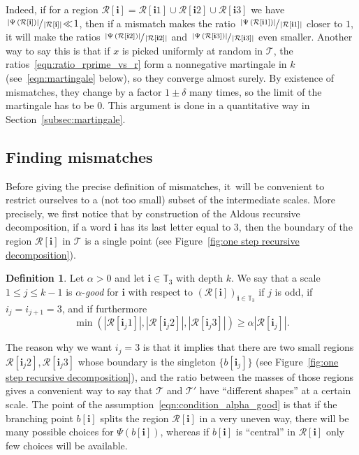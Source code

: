 \documentclass[11pt]{article}
\newcommand{\Tt}{\mathcal{T}}
\newcommand{\Rr}{\mathcal{R}}
\newcommand{\ii}{\mathbf{i}}
\theoremstyle{plain}
\theoremstyle{definition}
\newtheorem{definition}[theorem]{Definition}
\numberwithin{equation}{section}
\begin{document}
Indeed, if for a region $\Rr[\ii]=\Rr[\ii 1] \cup \Rr[\ii 2] \cup \Rr[\ii 3]$ we have \hbox{$\sfrac{\left|\Psi \left( \Rr[\ii] \right)\right|}{\left|\Rr[\ii] \right|}\!\ll\! 1$}, then if a mismatch makes the ratio $\sfrac{\left|\Psi \left( \Rr[\ii 1] \right)\right|}{\left|\Rr[\ii 1] \right|}$ closer to $1$, it will make the ratios $\sfrac{\left|\Psi \left( \Rr[\ii 2] \right)\right|}{\left|\Rr[\ii 2] \right|}$ and $\sfrac{\left|\Psi \left( \Rr[\ii 3] \right)\right|}{\left|\Rr[\ii 3] \right|}$ even smaller. Another way to say this is that if $x$ is picked uniformly at random in $\Tt$, the ratios~\eqref{eqn:ratio_rprime_vs_r} form a nonnegative martingale in $k$ (see~\eqref{eqn:martingale} below), so they converge almost surely. By existence of mismatches, they change by a factor $1\pm\delta$ many times, so the limit of the martingale has to be $0$. This argument is done in a quantitative way in Section~\ref{subsec:martingale}.

\subsection{Finding mismatches}\label{subsec:mismatches}

Before giving the precise definition of mismatches, it~will be convenient to restrict ourselves to a (not too small) subset of the intermediate scales. More precisely, we first notice that by construction of the Aldous recursive decomposition, if a word $\ii$ has its last letter equal to $3$, then the boundary of the region $\Rr[\ii]$ in $\Tt$ is a single point (see Figure~\ref{fig:one step recursive decomposition}).
\begin{definition}\label{defn:good_scale}
Let $\alpha>0$ and let $\ii \in \mathbb{T}_3$ with depth $k$.
We say that a scale $1 \leq j \leq k-1$ is $\alpha$-\emph{good} for $\ii$ with respect to $\left( \Rr[\ii]\right)_{\ii \in \mathbb{T}_3}$ if $j$ is odd, if $i_j=i_{j+1}=3$, and if furthermore
\begin{equation}\label{eqn:condition_alpha_good}
\min \left( \left| \Rr[\ii_j 1] \right|, \left| \Rr[\ii_j 2] \right|, \left| \Rr[\ii_j 3] \right| \right) \geq \alpha \left| \Rr[\ii_j] \right|.
\end{equation}
\end{definition}
The reason why we want $i_j=3$ is that it implies that there are two small regions $\Rr[\ii_j 2], \Rr[\ii_j 3]$ whose boundary is the singleton $\{ b[\ii_j] \}$ (see Figure~\ref{fig:one step recursive decomposition}), and the ratio between the masses of those regions gives a convenient way to say that $\Tt$ and $\Tt'$ have ``different shapes'' at a certain scale.
The point of the assumption~\eqref{eqn:condition_alpha_good} is that if the branching point $b[\ii]$ splits the region $\Rr[\ii]$ in a very uneven way, there will be many possible choices for $\Psi(b[\ii])$, whereas if $b[\ii]$ is ``central'' in $\Rr[\ii]$ only few choices will be available.
\end{document}
